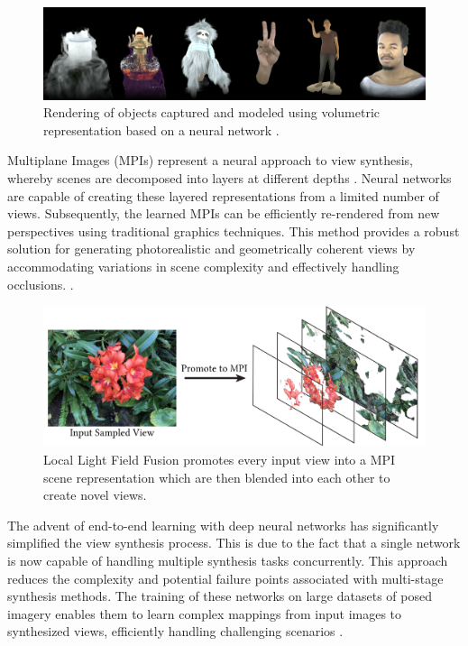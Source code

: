 \begin{figure}[h!]
  \centering
	\includegraphics[width=\textwidth]{figures/bg-neural-volumetric.png}
	\caption{Rendering of objects captured and modeled using volumetric representation based on a neural network \cite{lombardi_neural_2019}.}
  \label{fig:background-neural-volumetric}
\end{figure}

Multiplane Images (MPIs) represent a neural approach to view synthesis, whereby scenes are decomposed into layers at different depths .
Neural networks are capable of creating these layered representations from a limited number of views.
Subsequently, the learned MPIs can be efficiently re-rendered from new perspectives using traditional graphics techniques.
This method provides a robust solution for generating photorealistic and geometrically coherent views by accommodating variations in scene complexity and effectively handling occlusions. \cite{mildenhall_local_2019,penner_soft_2017,pratul_p_srinivasan_pushing_2019,tao_zhou_stereo_2018}.


\begin{figure}[h!]
  \centering
	\includegraphics[width=.7\textwidth]{figures/background-mpi.png}
	\caption{Local Light Field Fusion \cite{mildenhall_local_2019} promotes every input view into a MPI scene representation which are then blended into each other to create novel views.}
  \label{fig:background-mpi}
\end{figure}

The advent of end-to-end learning with deep neural networks has significantly simplified the view synthesis process. This is due to the fact that a single network is now capable of handling multiple synthesis tasks concurrently.
This approach reduces the complexity and potential failure points associated with multi-stage synthesis methods.
The training of these networks on large datasets of posed imagery enables them to learn complex mappings from input images to synthesized views, efficiently handling challenging scenarios \cite{chen_photographic_2017,flynn_deep_2016}.


